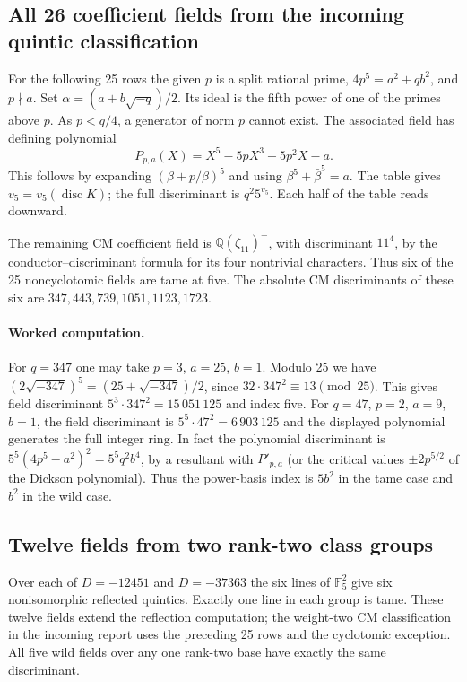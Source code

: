 \subsection{All 26 coefficient fields from the incoming quintic classification}
For the following 25 rows the given $p$ is a split rational prime, $4p^5=a^2+qb^2$, and $p\nmid a$. Set $\alpha=(a+b\sqrt{-q})/2$. Its ideal is the fifth power of one of the primes above $p$. As $p<q/4$, a generator of norm $p$ cannot exist. The associated field has defining polynomial
\[
 P_{p,a}(X)= X^5-5pX^3+5p^2X-a.
\]
This follows by expanding $(\beta+p/\beta)^5$ and using $\beta^5+\bar\beta^5=a$. The table gives $v_5=v_5(\operatorname{disc}K)$; the full discriminant is $q^2 5^{v_5}$. Each half of the table reads downward.

\noindent The remaining CM coefficient field is $\mathbb Q(\zeta_{11})^+$, with discriminant $11^4$, by the conductor--discriminant formula for its four nontrivial characters. Thus six of the 25 noncyclotomic fields are tame at five. The absolute CM discriminants of these six are $347,443,739,1051,1123,1723$.

\paragraph{Worked computation.}
For $q=347$ one may take $p=3$, $a=25$, $b=1$. Modulo 25 we have $(2\sqrt{-347})^5=(25+\sqrt{-347})/2$, since $32\cdot347^2\equiv13\pmod{25}$. This gives field discriminant $5^3\cdot347^2=15\,051\,125$ and index five. For $q=47$, $p=2$, $a=9$, $b=1$, the field discriminant is $5^5\cdot47^2=6\,903\,125$ and the displayed polynomial generates the full integer ring. In fact the polynomial discriminant is $5^5(4p^5-a^2)^2=5^5q^2 b^4$, by a resultant with $P'_{p,a}$ (or the critical values $\pm2p^{5/2}$ of the Dickson polynomial). Thus the power-basis index is $5b^2$ in the tame case and $b^2$ in the wild case.

\subsection{Twelve fields from two rank-two class groups}
Over each of $D=-12451$ and $D=-37363$ the six lines of $\mathbb F_5^2$ give six nonisomorphic reflected quintics. Exactly one line in each group is tame. These twelve fields extend the reflection computation; the weight-two CM classification in the incoming report uses the preceding 25 rows and the cyclotomic exception. All five wild fields over any one rank-two base have exactly the same discriminant.


